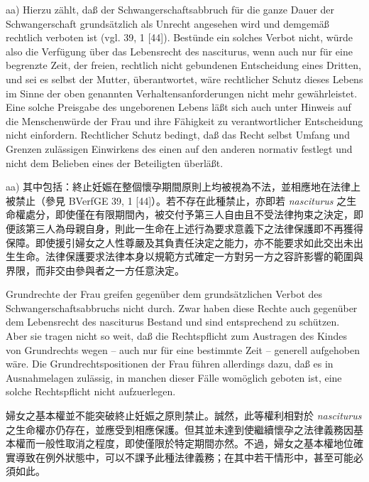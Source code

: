 \documentclass[12pt]{article}
\begin{document}
\begin{sourcepara}[title={原文D.47}]
aa) Hierzu zählt, daß der Schwangerschaftsabbruch für die ganze Dauer der Schwangerschaft grundsätzlich als Unrecht angesehen wird und demgemäß rechtlich verboten ist (vgl. \abbrBVerfGE{} 39, 1 [44]). Bestünde ein solches Verbot nicht, würde also die Verfügung über das Lebensrecht des nasciturus, wenn auch nur für eine begrenzte Zeit, der freien, rechtlich nicht gebundenen Entscheidung eines Dritten, und sei es selbst der Mutter, überantwortet, wäre rechtlicher Schutz dieses Lebens im Sinne der oben genannten Verhaltensanforderungen nicht mehr gewährleistet. Eine solche Preisgabe des ungeborenen Lebens läßt sich auch unter Hinweis auf die Menschenwürde der Frau und ihre Fähigkeit zu verantwortlicher Entscheidung nicht einfordern. Rechtlicher Schutz bedingt, daß das Recht selbst Umfang und Grenzen zulässigen Einwirkens des einen auf den anderen normativ festlegt und nicht dem Belieben eines der Beteiligten überläßt.
\end{sourcepara}
\begin{transpara}
aa) 其中包括：終止妊娠在整個懷孕期間原則上均被視為不法，並相應地在法律上被禁止（參見 BVerfGE 39, 1 [44]）。若不存在此種禁止，亦即若 \textit{nasciturus} 之生命權處分，即使僅在有限期間內，被交付予第三人自由且不受法律拘束之決定，即便該第三人為母親自身，則此一生命在上述行為要求意義下之法律保護即不再獲得保障。即使援引婦女之人性尊嚴及其負責任決定之能力，亦不能要求如此交出未出生生命。法律保護要求法律本身以規範方式確定一方對另一方之容許影響的範圍與界限，而非交由參與者之一方任意決定。
\end{transpara}

\begin{sourcepara}[title={原文D.48}]
Grundrechte der Frau greifen gegenüber dem grundsätzlichen Verbot des Schwangerschaftsabbruchs nicht durch. Zwar haben diese Rechte auch gegenüber dem Lebensrecht des nasciturus Bestand und sind entsprechend zu schützen. Aber sie tragen nicht so weit, daß die Rechtspflicht zum Austragen des Kindes von Grundrechts wegen -- auch nur für eine bestimmte Zeit -- generell aufgehoben wäre. Die Grundrechtspositionen der Frau führen allerdings dazu, daß es in Ausnahmelagen zulässig, in manchen dieser Fälle womöglich geboten ist, eine solche Rechtspflicht nicht aufzuerlegen.
\end{sourcepara}
\begin{transpara}
婦女之基本權並不能突破終止妊娠之原則禁止。誠然，此等權利相對於 \textit{nasciturus} 之生命權亦仍存在，並應受到相應保護。但其並未達到使繼續懷孕之法律義務因基本權而一般性取消之程度，即使僅限於特定期間亦然。不過，婦女之基本權地位確實導致在例外狀態中，可以不課予此種法律義務；在其中若干情形中，甚至可能必須如此。
\end{transpara}
\end{document}

